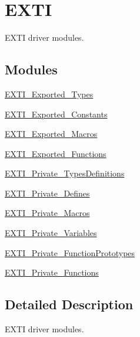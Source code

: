 \hypertarget{group___e_x_t_i}{}\section{E\+X\+TI}
\label{group___e_x_t_i}


E\+X\+TI driver modules.  


\subsection*{Modules}
\begin{DoxyCompactItemize}
\item 
\hyperlink{group___e_x_t_i___exported___types}{E\+X\+T\+I\+\_\+\+Exported\+\_\+\+Types}
\item 
\hyperlink{group___e_x_t_i___exported___constants}{E\+X\+T\+I\+\_\+\+Exported\+\_\+\+Constants}
\item 
\hyperlink{group___e_x_t_i___exported___macros}{E\+X\+T\+I\+\_\+\+Exported\+\_\+\+Macros}
\item 
\hyperlink{group___e_x_t_i___exported___functions}{E\+X\+T\+I\+\_\+\+Exported\+\_\+\+Functions}
\item 
\hyperlink{group___e_x_t_i___private___types_definitions}{E\+X\+T\+I\+\_\+\+Private\+\_\+\+Types\+Definitions}
\item 
\hyperlink{group___e_x_t_i___private___defines}{E\+X\+T\+I\+\_\+\+Private\+\_\+\+Defines}
\item 
\hyperlink{group___e_x_t_i___private___macros}{E\+X\+T\+I\+\_\+\+Private\+\_\+\+Macros}
\item 
\hyperlink{group___e_x_t_i___private___variables}{E\+X\+T\+I\+\_\+\+Private\+\_\+\+Variables}
\item 
\hyperlink{group___e_x_t_i___private___function_prototypes}{E\+X\+T\+I\+\_\+\+Private\+\_\+\+Function\+Prototypes}
\item 
\hyperlink{group___e_x_t_i___private___functions}{E\+X\+T\+I\+\_\+\+Private\+\_\+\+Functions}
\end{DoxyCompactItemize}


\subsection{Detailed Description}
E\+X\+TI driver modules. 

